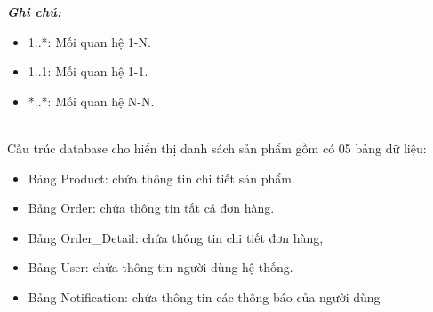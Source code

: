\textbf{\textit{Ghi chú:}}
\begin{itemize}
    \item 1..*: Mối quan hệ 1-N.
    \item 1..1: Mối quan hệ 1-1.
    \item *..*: Mối quan hệ N-N.
\end{itemize}
\\[0.5cm]
\noindent Cấu trúc database cho hiển thị danh sách sản phẩm gồm có 05 bảng dữ liệu:
\begin{itemize}
    \item Bảng Product: chứa thông tin chi tiết sản phẩm.
    \item Bảng Order: chứa thông tin tất cả đơn hàng.
    \item Bảng Order\_Detail: chứa thông tin chi tiết đơn hàng, 
    \item Bảng User: chứa thông tin người dùng hệ thống.
    \item Bảng Notification: chứa thông tin các thông báo của người dùng
\end{itemize}
